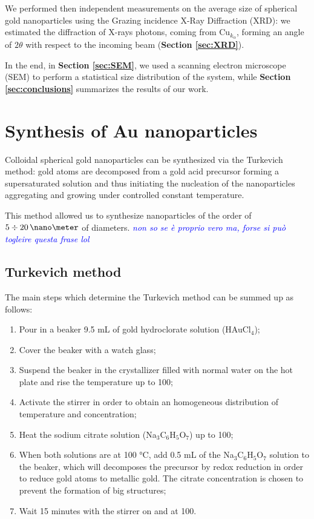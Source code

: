 \documentclass[twocolumn]{article}
\newcommand{\gio}[1]{\textcolor{blue}{\textit{#1}}}
\begin{document}
\begin{multicols}{2}
We performed then independent measurements on the average size of spherical gold nanoparticles using the Grazing incidence X-Ray Diffraction (XRD): we estimated the diffraction of X-rays photons, coming from \(\text{Cu}_{k_\alpha}\), forming an angle of \(2\theta\) with respect to the incoming beam (\textbf{Section \ref{sec:XRD}}).

In the end, in \textbf{Section \ref{sec:SEM}}, we used a scanning electron microscope (SEM) to perform a statistical size distribution of the system, while \textbf{Section \ref{sec:conclusions}} summarizes the results of our work.

\newpage

\section{Synthesis of Au nanoparticles}
\label{sec:synthesis}
\noindent
Colloidal spherical gold nanoparticles can be synthesized via the Turkevich method: gold atoms are decomposed from a gold acid precursor forming a supersaturated solution and thus initiating the nucleation of the nanoparticles aggregating and growing under controlled constant temperature.

This method allowed us to synthesize nanoparticles of the order of $5 \div 20 \,\nano\meter$ of diameters. \gio{non so se è proprio vero ma, forse si può togleire questa frase lol}

\subsection{Turkevich method}
The main steps which determine the Turkevich method can be summed up as follows:

\begin{enumerate}
    \item Pour in a beaker 9.5 mL of gold hydroclorate solution (HAuCl$_4$);
    \item Cover the beaker with a watch glass;
    \item Suspend the beaker in the crystallizer filled with normal water on the hot plate and rise the temperature up to 100\degreecelsius;
    \item Activate the stirrer in order to obtain an homogeneous distribution of temperature and concentration;
    \item Heat the sodium citrate solution (Na$_3$C$_6$H$_5$O$_7$) up to 100\degreecelsius;
    \item When both solutions are at 100 °C, add 0.5 mL of the Na$_3$C$_6$H$_5$O$_7$ solution to the beaker, which will decomposes the precursor by redox reduction in order to reduce gold atoms to metallic gold. The citrate concentration is chosen to prevent the formation of big structures;
    \item Wait 15 minutes with the stirrer on and at 100\degreecelsius.
\end{enumerate}


\end{multicols}
\end{document}

